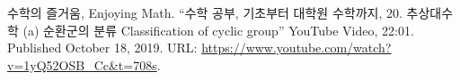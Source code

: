 \documentclass[11pt,openany]{article}
\begin{document}
\newpage
{}

\vfill
\begin{thebibliography}{9}
	수학의 즐거움, Enjoying Math. ``수학 공부, 기초부터 대학원 수학까지, 20. 추상대수학 (a) 순환군의 분류 Classification of cyclic group'' YouTube Video, 22:01. Published 
	October 18, 2019. URL: \url{https://www.youtube.com/watch?v=1yQ52OSB_Cc&t=708s}.
\end{thebibliography}

\appendix
\end{document}
